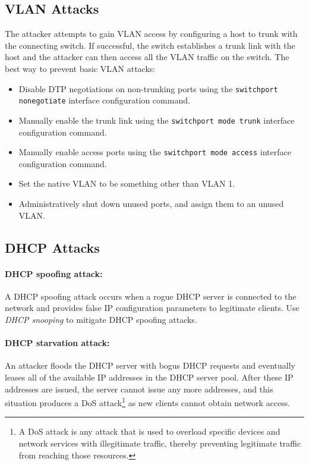 \subsection{VLAN Attacks}

The attacker attempts to gain VLAN access by configuring a host to trunk with the connecting switch. If successful, the switch establishes a trunk link with the host and the attacker can then access all the VLAN traffic on the switch. The best way to prevent basic VLAN attacks:

\begin{itemize}
\item Disable DTP negotiations on non-trunking ports using the \verb|switchport nonegotiate| interface configuration command.
\item Manually enable the trunk link using the \verb|switchport mode trunk| interface configuration command.
\item Manually enable access ports using the \verb|switchport mode access| interface configuration command.   
\item Set the native VLAN to be something other than VLAN 1.
\item Administratively shut down unused ports, and assign them to an unused VLAN.
\end{itemize}

\subsection{DHCP Attacks}

\paragraph{DHCP spoofing attack:} A DHCP spoofing attack occurs when a rogue DHCP server is connected to the network and provides false IP configuration parameters to legitimate clients. Use \emph{DHCP snooping} to mitigate DHCP spoofing attacks. 

\paragraph{DHCP starvation attack:} An attacker floods the DHCP server with bogus DHCP requests and eventually leases all of the available IP addresses in the DHCP server pool. After these IP addresses are issued, the server cannot issue any more addresses, and this situation produces a DoS attack\footnote{A DoS attack is any attack that is used to overload specific devices and network services with illegitimate traffic, thereby preventing legitimate traffic from reaching those resources.} as new clients cannot obtain network access. 

